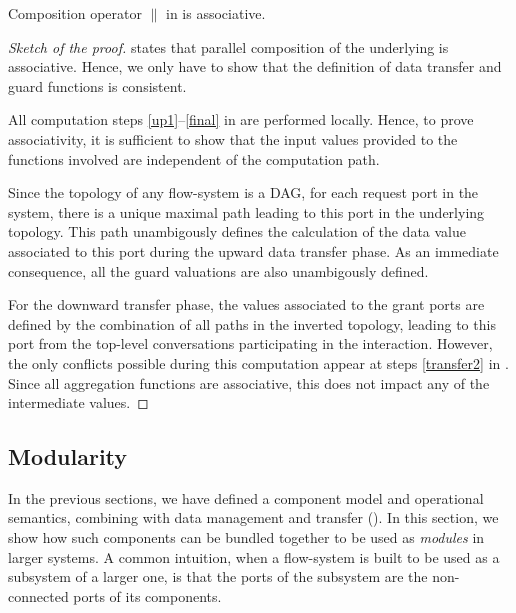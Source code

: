 \begin{proposition}
  \label{prop:data:associativity}
  Composition operator $\parallel$ in  is
  associative.
\end{proposition}
%
\begin{proof}[Sketch of the proof]
   states that parallel composition of the underlying
  \compmodel{} is associative.  Hence, we only have to show that the
  definition of data transfer and guard functions is consistent.  

  All computation steps \ref{up1}--\ref{final} in 
  are performed locally.  Hence, to prove associativity, it is sufficient
  to show that the input values provided to the functions involved are
  independent of the computation path.

  Since the topology of any flow-system is a DAG, for each request port in
  the system, there is a unique maximal path leading to this port in the
  underlying topology.  This path unambigously defines the calculation of
  the data value associated to this port during the upward data transfer
  phase.  As an immediate consequence, all the guard valuations are also
  unambigously defined.

  For the downward transfer phase, the values associated to the grant ports
  are defined by the combination of all paths in the inverted topology,
  leading to this port from the top-level conversations participating in
  the interaction.  However, the only conflicts possible during this
  computation appear at steps \ref{transfer2} in .
  Since all aggregation functions are associative, this does not impact any
  of the intermediate values.
\end{proof}


\subsection{Modularity}
\label{sec:modularity}

In the previous sections, we have defined a component model and operational
semantics, combining \compmodel{} with data management and transfer
().  In this section, we show how such components can be bundled
together to be used as \emph{modules} in larger systems.  A common
intuition, when a flow-system is built to be used as a subsystem of a
larger one, is that the ports of the subsystem are the non-connected ports
of its components.  

